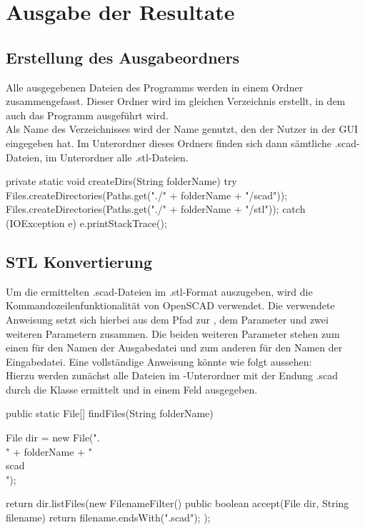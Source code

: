 \section{Ausgabe der Resultate}
\subsection{Erstellung des Ausgabeordners}
Alle ausgegebenen Dateien des Programms werden in einem Ordner zusammengefasst.
Dieser Ordner wird im gleichen Verzeichnis erstellt, in dem auch das Programm ausgeführt wird. \\
Als Name des Verzeichnisses wird der Name genutzt, den der Nutzer in der GUI eingegeben hat.
Im Unterordner  dieses Ordners finden sich dann sämtliche .scad-Dateien, im Unterordner  alle .stl-Dateien.
 
\begin{code}
	private static void createDirs(String folderName) {
		try {
			Files.createDirectories(Paths.get("./" + folderName + "/scad"));
			Files.createDirectories(Paths.get("./" + folderName + "/stl"));
		} catch (IOException e) {
			e.printStackTrace();
		}
	}
\end{code}

\subsection{STL Konvertierung}
Um die ermittelten .scad-Dateien im .stl-Format auszugeben, wird die Kommandozeilenfunktionalität von OpenSCAD verwendet.
Die verwendete Anweisung setzt sich hierbei aus dem Pfad zur , dem Parameter  und zwei weiteren Parametern zusammen. 
Die beiden weiteren Parameter stehen zum einen für den Namen der Ausgabedatei und zum anderen für den Namen der Eingabedatei.
Eine vollständige Anweisung könnte wie folgt aussehen:  \\
Hierzu werden zunächst alle Dateien im -Unterordner mit der Endung .scad durch die Klasse  ermittelt und in einem Feld ausgegeben.

\begin{code}
	public static File[] findFiles(String folderName){
		File dir = new File(".\\" + folderName + "\\scad\\");
		
		return dir.listFiles(new FilenameFilter() { 
			public boolean accept(File dir, String filename)
			{ return filename.endsWith(".scad"); }
		});
	}
\end{code}

